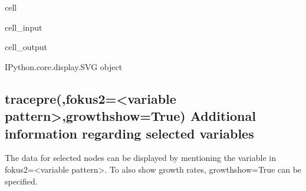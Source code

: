 \documentclass[letterpaper,10pt,english]{jupyterBook}
\begin{document}
\begin{sphinxuseclass}{cell}\begin{sphinxVerbatimInput}

\begin{sphinxuseclass}{cell_input}
\begin{sphinxVerbatim}[commandchars=\\\{\}]
  
\end{sphinxVerbatim}

\end{sphinxuseclass}\end{sphinxVerbatimInput}
\begin{sphinxVerbatimOutput}

\begin{sphinxuseclass}{cell_output}
\begin{sphinxVerbatim}[commandchars=\\\{\}]
\PYGZlt{}IPython.core.display.SVG object\PYGZgt{}
\end{sphinxVerbatim}

\end{sphinxuseclass}\end{sphinxVerbatimOutput}

\end{sphinxuseclass}

\subsection{tracepre(,fokus2=<variable pattern>,growthshow=True) Additional information regarding selected variables}
\label{\detokenize{content/howto/structure/Logical_structure:tracepre-fokus2-variable-pattern-growthshow-true-additional-information-regarding-selected-variables}}
\sphinxAtStartPar
The data for selected nodes can be displayed by mentioning the variable in fokus2=<variable pattern>.
To also show growth rates, growthshow=True can be specified.
\end{document}
